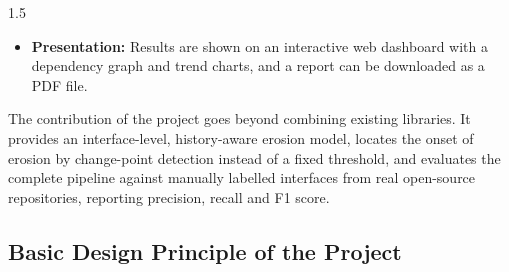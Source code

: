 \documentclass[12pt,a4paper]{article}
\begin{document}
\begin{spacing}{1.5}
\begin{itemize}[leftmargin=*,itemsep=2pt]
  \item \textbf{Presentation:} Results are shown on an interactive web
        dashboard with a dependency graph and trend charts, and a report
        can be downloaded as a PDF file.
\end{itemize}

The contribution of the project goes beyond combining existing libraries.
It provides an interface-level, history-aware erosion model, locates the
onset of erosion by change-point detection instead of a fixed threshold,
and evaluates the complete pipeline against manually labelled interfaces
from real open-source repositories, reporting precision, recall and F1 score.
\end{spacing}

\subsection{Basic Design Principle of the Project}
\end{document}
